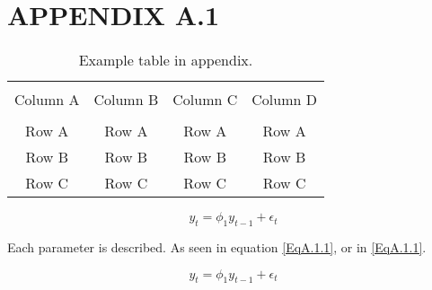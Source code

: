 \chapter{APPENDIX A.1}
\renewcommand{\theequation}{A.1.\arabic{equation}}
\setcounter{equation}{0}

\begin{table*}[!ht]
	{\setlength{\tabcolsep}{14pt}
		\caption{Example table in appendix.}
		\begin{center}
			\vspace{-6mm}
			\begin{tabular}{cccc}
				\hline \\[-2.45ex] \hline \\[-2.1ex]
				Column A & Column B & Column C & Column D \\
				\hline \\[-1.8ex]
				Row A & Row A & Row A & Row A \\
				Row B & Row B & Row B & Row B \\
				Row C & Row C & Row C & Row C \\
				[-0ex] \hline
			\end{tabular}
			\vspace{-6mm}
		\end{center}
		\label{TableA.1}}
\end{table*}

\begin{equation}
y_{t} = \phi_{1} y_{t-1} + \epsilon_{t}
\label{EqA.1.1}
\end{equation}

Each parameter is described. As seen in equation \eqref{EqA.1.1}, or in \ref{EqA.1.1}.

\begin{equation}
y_{t} = \phi_{1} y_{t-1} + \epsilon_{t}
\label{EqA.1.2}
\end{equation}

\vspace*{12pt}
